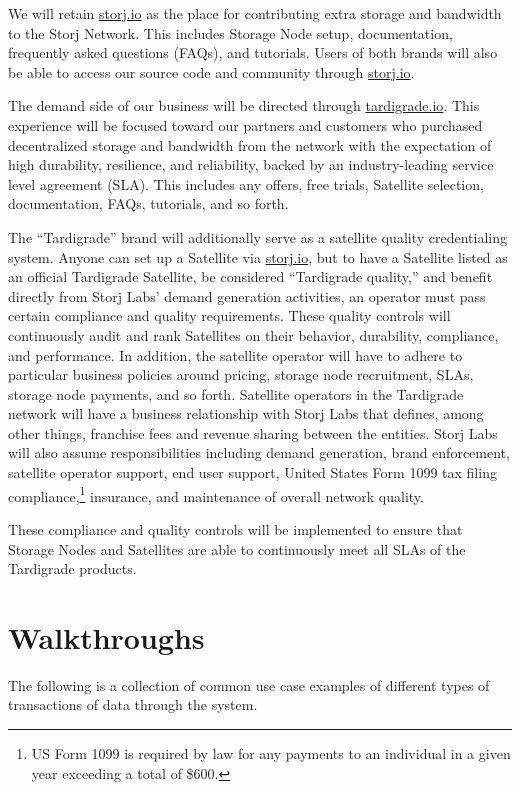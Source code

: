 \documentclass[8pt,fleqn,openany]{book}
\begin{document}
We will retain \url{storj.io} as the place for contributing extra storage and
bandwidth to the Storj Network. This includes Storage Node setup, documentation,
frequently asked questions (FAQs), and tutorials. Users of both brands will also be able to
access our source code and community through \url{storj.io}.

The demand side of our business will be directed through \url{tardigrade.io}.
This experience will be focused toward our partners and customers who purchased
decentralized storage and bandwidth from the network with the expectation of
high durability, resilience, and reliability, backed by an industry-leading
service level agreement (SLA). This includes any offers, free trials, Satellite
selection, documentation, FAQs, tutorials, and so forth.

The ``Tardigrade'' brand will additionally serve as a satellite quality
credentialing system. Anyone can set up a Satellite via
\url{storj.io}, but to have a Satellite listed as an official Tardigrade
Satellite, be considered ``Tardigrade quality,'' and benefit directly from
Storj Labs' demand generation activities, an operator must pass
certain compliance and quality requirements.
These quality controls will continuously audit and rank Satellites on their
behavior, durability, compliance, and performance.
In addition, the satellite operator will have to adhere to particular business
policies around pricing, storage node recruitment, SLAs, storage node payments,
and so forth. Satellite operators in the Tardigrade network will have a business
relationship with Storj Labs that defines, among other things, franchise fees
and revenue sharing between the entities. Storj Labs will also assume
responsibilities including demand generation, brand enforcement, satellite
operator support, end user support, United States Form 1099 tax filing
compliance,\footnote{US Form 1099 is required by law for any payments to an
individual in a given year exceeding a total of \$600.}
insurance, and maintenance of overall network quality.

These compliance and quality controls will be implemented to ensure that
Storage Nodes and Satellites are able to continuously meet all SLAs of the
Tardigrade products.

\chapter{Walkthroughs}\label{chap:walkthroughs}

The following is a collection of common use case examples of different types of
transactions of data through the system.
\end{document}
